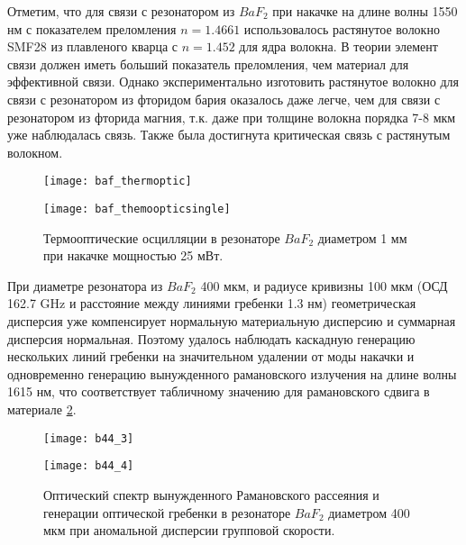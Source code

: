Отметим, что для связи с резонатором из $BaF_2$ при накачке на длине волны 1550 нм с показателем преломления $n=1.4661$ использовалось растянутое волокно SMF28 из плавленого кварца с $n=1.452$ для ядра волокна. В теории элемент связи должен иметь больший показатель преломления, чем материал для эффективной связи. Однако экспериментально изготовить растянутое волокно для связи с резонатором из фторидом бария оказалось даже легче, чем для связи с резонатором из фторида магния, т.к. даже при толщине волокна порядка 7-8 мкм уже наблюдалась связь. Также была достигнута критическая связь с растянутым волокном.

\begin{figure}[ht]
\begin{minipage}[ht]{0.49\linewidth}\centering
    \texttt{[image: baf\_thermoptic]}
  \end{minipage}
  \hfill
  \begin{minipage}[ht]{0.49\linewidth}\centering
    \texttt{[image: baf\_themoopticsingle]}
  \end{minipage}
    \caption{Термооптические осцилляции в резонаторе $BaF_2$ диаметром 1 мм при накачке мощностью 25 мВт.}
  \label{baf_thermoptic}
\end{figure}

При диаметре резонатора из $BaF_2$ 400 мкм, и радиусе кривизны 100 мкм (ОСД 162.7 GHz и расстояние между линиями гребенки 1.3 нм) геометрическая дисперсия уже компенсирует нормальную материальную дисперсию и суммарная дисперсия нормальная. Поэтому удалось наблюдать каскадную генерацию нескольких линий гребенки на значительном удалении от моды накачки и одновременно генерацию вынужденного рамановского излучения на длине волны 1615 нм, что соответствует табличному значению для рамановского сдвига в материале \ref{baf_comb_anomal}.
 
\begin{figure}[ht]
\begin{minipage}[ht]{0.49\linewidth}\centering
    \texttt{[image: b44\_3]}
  \end{minipage}
  \hfill
  \begin{minipage}[ht]{0.49\linewidth}\centering
    \texttt{[image: b44\_4]}
  \end{minipage}
    \caption{Оптический спектр вынужденного Рамановского рассеяния и генерации оптической гребенки в резонаторе $BaF_2$ диаметром 400 мкм при аномальной дисперсии групповой скорости.}
  \label{baf_comb_anomal}
\end{figure}

